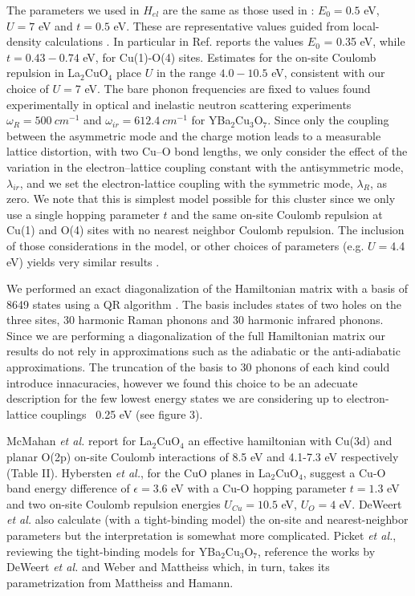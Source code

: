 The parameters we used in $H_{el}$  are the same as those used in \cite{MirandaMena2006}: $E_0=0.5$ eV, $U=7$ eV and $t=0.5$ eV. These are representative values guided from local-density calculations \cite{Pickett1989}. In particular in Ref. \cite{DeWeert1989} reports the values $E_0$ = 0.35 eV, while $t=0.43-0.74$ eV, for Cu(1)-O(4) sites. Estimates for the on-site Coulomb repulsion in La$_2$CuO$_4$ place $U$ in the range $4.0-10.5$ eV, \cite{Hybertsen1989} consistent with our choice of $U=$7 eV.  The bare phonon frequencies are fixed to values found experimentally in optical and inelastic neutron scattering experiments $\omega_R = 500\ cm^{-1}$ and $\omega_{ir} = 612.4\ cm^{-1}$ for YBa$_2$Cu$_3$O$_7$. Since only the coupling between the asymmetric mode and the charge motion leads to a measurable lattice distortion, with two Cu–O bond lengths, we only consider the effect of the variation in the electron–lattice coupling constant with the antisymmetric mode, $\lambda_{ir}$,  and we set the electron-lattice coupling with the symmetric mode, $\lambda_R$, as zero. We note that this is simplest model possible for this cluster since we only use a single hopping parameter $t$ and the same on-site Coulomb repulsion at Cu(1) and O(4) sites with no nearest neighbor Coulomb repulsion. The inclusion of those considerations in the model, or other choices of parameters (e.g. $U = $4.4 eV) yields very similar results \cite{Salkola1994}.

We performed an exact diagonalization of the Hamiltonian matrix with a basis of 8649 states using a QR algorithm \cite{eigenweb}. The basis includes states of two holes on the three sites, 30 harmonic Raman phonons and 30 harmonic infrared phonons. Since we are performing a diagonalization of the full Hamiltonian matrix our results do not rely in approximations such as the adiabatic or the anti-adiabatic approximations. The  truncation of the basis to 30 phonons of each kind could introduce innacuracies, however we found this choice to be an adecuate description for the few lowest energy states we are considering up to electron-lattice couplings ~0.25 eV (see figure 3).

McMahan \textit{et al.}\cite{McMahan1988} report for La$_{2}$CuO$_{4}$ an effective hamiltonian with Cu(3d) and planar O(2p) on-site Coulomb interactions of 8.5 eV and 4.1-7.3 eV respectively (Table II). Hybersten \textit{et al.}\cite{Hybertsen1989}, for the CuO planes in La$_{2}$CuO$_{4}$, suggest a Cu-O band energy difference of $\epsilon = 3.6$ eV with a Cu-O hopping parameter $t = 1.3$ eV and two on-site Coulomb repulsion energies $U_{Cu} = 10.5$ eV, $U_O = 4$ eV. DeWeert \textit{et al.}\cite{DeWeert1989} also calculate (with a tight-binding model) the on-site and nearest-neighbor parameters but the interpretation is somewhat more complicated. Picket \textit{et al.}\cite{Pickett1989}, reviewing the tight-binding models for YBa$_{2}$Cu$_{3}$O$_{7}$, reference the works by DeWeert \textit{et al.}\cite{DeWeert1989} and Weber and Mattheiss\cite{Weber1988} which, in turn, takes its parametrization from Mattheiss and Hamann\cite{Mattheiss1987}.

